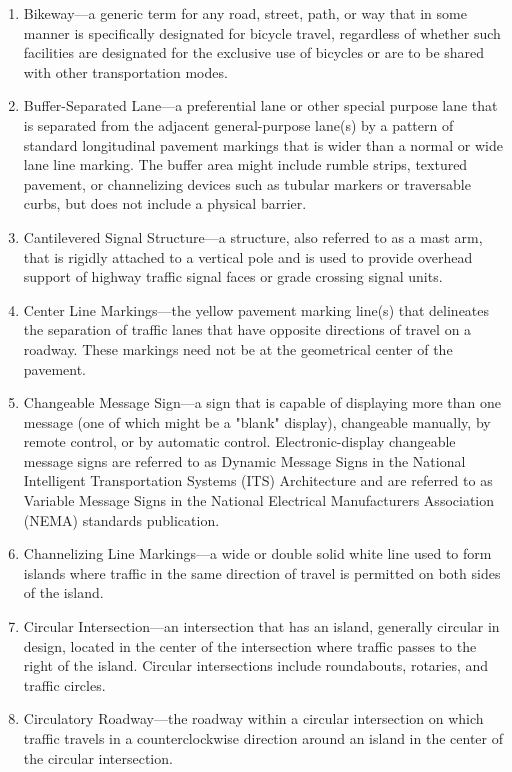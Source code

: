 \documentclass[9pt]{memoir}
\begin{document}
{\begin{enumerate}[label=\arabic*., ref=\arabic*]
\item Bikeway---a generic term for any road, street, path, or way that in some manner is specifically designated for bicycle travel, regardless of whether such facilities are designated for the exclusive use of bicycles or are to be shared with other transportation modes.
\item Buffer-Separated Lane---a preferential lane or other special purpose lane that is separated from the adjacent general-purpose lane(s) by a pattern of standard longitudinal pavement markings that is wider than a normal or wide lane line marking. The buffer area might include rumble strips, textured pavement, or channelizing devices such as tubular markers or traversable curbs, but does not include a physical barrier.
\item Cantilevered Signal Structure---a structure, also referred to as a mast arm, that is rigidly attached to a vertical pole and is used to provide overhead support of highway traffic signal faces or grade crossing signal units.
\item Center Line Markings---the yellow pavement marking line(s) that delineates the separation of traffic lanes that have opposite directions of travel on a roadway. These markings need not be at the geometrical center of the pavement.
\item Changeable Message Sign---a sign that is capable of displaying more than one message (one of which might be a "blank" display), changeable manually, by remote control, or by automatic control. Electronic-display changeable message signs are referred to as Dynamic Message Signs in the National Intelligent Transportation Systems (ITS) Architecture and are referred to as Variable Message Signs in the National Electrical Manufacturers Association (NEMA) standards publication.
\item Channelizing Line Markings---a wide or double solid white line used to form islands where traffic in the same direction of travel is permitted on both sides of the island.
\item Circular Intersection---an intersection that has an island, generally circular in design, located in the center of the intersection where traffic passes to the right of the island. Circular intersections include roundabouts, rotaries, and traffic circles.
\item Circulatory Roadway---the roadway within a circular intersection on which traffic travels in a counterclockwise direction around an island in the center of the circular intersection.

\end{enumerate}}
\end{document}
